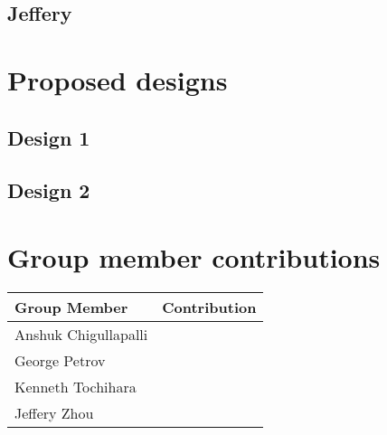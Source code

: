    \subsection{Jeffery}

\section{Proposed designs}

    \subsection{Design 1}
    \subsection{Design 2}

\section{Group member contributions}

    \begin{table}[H]
        \begin{center}
        \begin{tabular}{ | p{2in} | p{4in}| } 
            \hline
            \textbf{Group Member} & \textbf{Contribution} \\  \hline
            Anshuk Chigullapalli & \\ \hline
            George Petrov & \\ \hline
            Kenneth Tochihara & \\ \hline
            Jeffery Zhou & \\ \hline
        \end{tabular}
        \end{center}
    \end{table}

% 


% 
    
